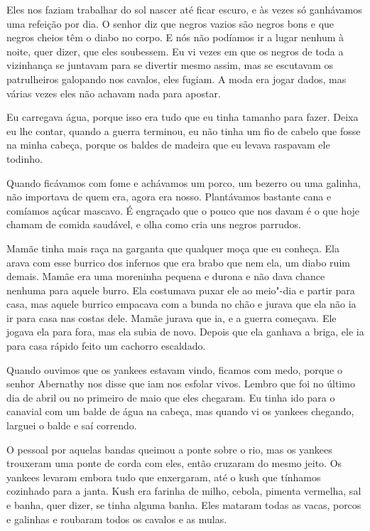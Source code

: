 Eles nos faziam trabalhar do sol nascer até ficar escuro, e às vezes só
ganhávamos uma refeição por dia. O senhor diz que negros vazios são
negros bons e que negros cheios têm o diabo no corpo. E nós não podíamos
ir a lugar nenhum à noite, quer dizer, que eles soubessem. Eu vi vezes
em que os negros de toda a vizinhança se juntavam para se divertir mesmo
assim, mas se escutavam os patrulheiros galopando nos cavalos, eles
fugiam. A moda era jogar dados, mas várias vezes eles não achavam nada
para apostar.

Eu carregava água, porque isso era tudo que eu tinha tamanho para fazer.
Deixa eu lhe contar, quando a guerra terminou, eu não tinha um fio de
cabelo que fosse na minha cabeça, porque os baldes de madeira que eu
levava raspavam ele todinho.

Quando ficávamos com fome e achávamos um porco, um bezerro ou uma
galinha, não importava de quem era, agora era nosso. Plantávamos
bastante cana e comíamos açúcar mascavo. É engraçado que o pouco que nos
davam é o que hoje chamam de comida saudável, e olha como cria uns
negros parrudos.

Mamãe tinha mais raça na garganta que qualquer moça que eu conheça. Ela
arava com esse burrico dos infernos que era brabo que nem ela, um diabo
ruim demais. Mamãe era uma moreninha pequena e durona e não dava chance
nenhuma para aquele burro. Ela costumava puxar ele ao meio"-dia e partir
para casa, mas aquele burrico empacava com a bunda no chão e jurava que
ela não ia ir para casa nas costas dele. Mamãe jurava que ia, e a guerra
começava. Ele jogava ela para fora, mas ela subia de novo. Depois que
ela ganhava a briga, ele ia para casa rápido feito um cachorro
escaldado.

Quando ouvimos que os yankees estavam vindo, ficamos com medo, porque o
senhor Abernathy nos disse que iam nos esfolar vivos. Lembro que foi no
último dia de abril ou no primeiro de maio que eles chegaram. Eu tinha
ido para o canavial com um balde de água na cabeça, mas quando vi os
yankees chegando, larguei o balde e saí correndo.

O pessoal por aquelas bandas queimou a ponte sobre o rio, mas os yankees
trouxeram uma ponte de corda com eles, então cruzaram do mesmo jeito. Os
yankees levaram embora tudo que enxergaram, até o kush que tínhamos
cozinhado para a janta. Kush era farinha de milho, cebola, pimenta
vermelha, sal e banha, quer dizer, se tinha alguma banha. Eles mataram
todas as vacas, porcos e galinhas e roubaram todos os cavalos e as
mulas.

